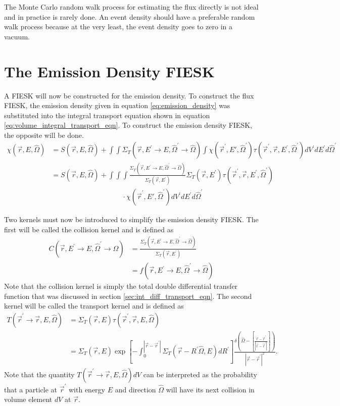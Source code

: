 The Monte Carlo random walk process for estimating the flux directly is not 
ideal and in practice is rarely done. An event density should have a preferable 
random walk process because at the very least, the event density goes to zero 
in a vacuum. 

\section{The Emission Density FIESK}
A FIESK will now be constructed for the emission density. To construct the
flux FIESK, the emission density given in equation \ref{eq:emission_density} was
substituted into the integral transport equation shown in equation 
\ref{eq:volume_integral_transport_eqn}. To construct the emission density FIESK,
the opposite will be done. 
\begin{align}
    \chi(\vec{r},E,\hat{\Omega}) & = S(\vec{r},E,\hat{\Omega}) +
    \int\int \Sigma_T(\vec{r},E^{'} \to E, \hat{\Omega}^{'} \to \hat{\Omega})
    \int \chi(\vec{r}^{'},E',\hat{\Omega}^{'})
    \tau(\vec{r}^{'},\vec{r},E^{'},\hat{\Omega}^{'})dV^{'}dE^{'}d\hat{\Omega}^{'} 
    \nonumber \\
    & = S(\vec{r},E,\hat{\Omega}) + \int\int\int
    \frac{\Sigma_T(\vec{r},E^{'} \to E, \hat{\Omega}^{'} \to \hat{\Omega})}
    {\Sigma_T(\vec{r},E^{'})} \Sigma_T(\vec{r},E^{'}) 
    \tau(\vec{r}^{'},\vec{r},E^{'},\hat{\Omega}^{'}) \nonumber \\
    & \qquad \qquad \qquad \qquad \qquad \cdot 
    \chi(\vec{r}^{'},E',\hat{\Omega}^{'}) dV^{'}dE^{'}d\hat{\Omega}^{'} \nonumber
\end{align}

Two kernels must now be introduced to simplify the emission density FIESK. The
first will be called the collision kernel and is defined as 
\begin{align}
  C(\vec{r},E^{'} \to E,\hat{\Omega}^{'} \to \hat{\Omega}) & = 
  \frac{\Sigma_T(\vec{r},E^{'} \to E,\hat{\Omega}^{'} \to \hat{\Omega})}
       {\Sigma_T(\vec{r},E^{'})} \nonumber \\
  & = f(\vec{r},E^{'} \to E,\hat{\Omega}^{'} \to \hat{\Omega})
\end{align}
Note that the collision kernel is simply the total double differential transfer 
function that was discussed in section \ref{sec:int_diff_transport_eqn}.
The second kernel will be called the transport kernel and is defined as
\begin{align}
  T(\vec{r}^{'} \to \vec{r},E,\hat{\Omega}) & = \Sigma_T(\vec{r},E)
  \tau(\vec{r}^{'},\vec{r},E,\hat{\Omega}) \nonumber \\
  & = \Sigma_T(\vec{r},E)
  \exp{\left[-\int_0^{|\vec{r} - \vec{r}^{'}|} 
    \Sigma_T(\vec{r}-R^{'}\hat{\Omega},E)dR^{'} \right]} 
  \frac{\delta \left(\hat{\Omega} - \left[\frac{\vec{r} - \vec{r}^{'}}
      {|\vec{r} - \vec{r}^{'}|}\right]\right)}
       {|\vec{r} - \vec{r}^{'}|^2}.
  \label{eq:transport_kernel}
\end{align}
Note that the quantity $T(\vec{r}^{'} \to \vec{r},E,\hat{\Omega})dV$ can be 
interpreted as the probability that a particle at $\vec{r}^{'}$ with energy $E$ 
and direction $\hat{\Omega}$ will have its next collision in volume element $dV$
at $\vec{r}$.
 
